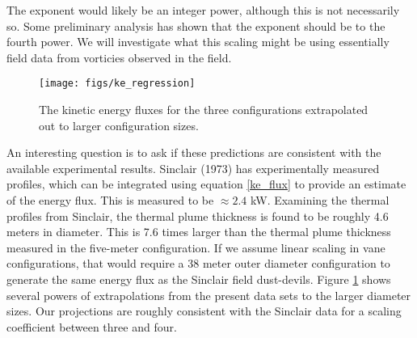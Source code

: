 \documentclass[english]{article}
\begin{document}
The exponent would likely be an integer power, although this is not necessarily so. Some preliminary 
analysis has shown that the exponent should be to the fourth power. We will investigate what this scaling might be 
using essentially field data from vorticies observed in the field. 

\begin{figure}[!htb]
  \begin{center}
    \texttt{[image: figs/ke\_regression]}
    \caption{The kinetic energy fluxes for the three configurations extrapolated out to larger configuration sizes.}
    \label{fig:ke_regression}
  \end{center}
\end{figure}

An interesting question is to ask if these predictions are consistent with the available experimental results. 
Sinclair (1973) has experimentally measured profiles, which can be integrated using equation \ref{ke_flux} to 
provide an estimate of the energy flux. This is measured to be $\approx 2.4$ kW. Examining the thermal 
profiles from Sinclair, the thermal plume thickness is found to be roughly 4.6 meters in diameter. This is 
7.6 times larger than the thermal plume thickness measured in the five-meter configuration. If we assume 
linear scaling in vane configurations, that would require a 38 meter outer diameter configuration to 
generate the same energy flux as the Sinclair field dust-devils. Figure \ref{fig:ke_regression} shows 
several powers of extrapolations from the present data sets to the larger diameter sizes. Our projections 
are roughly consistent with the Sinclair data for a scaling coefficient between three and four. 
\end{document}
